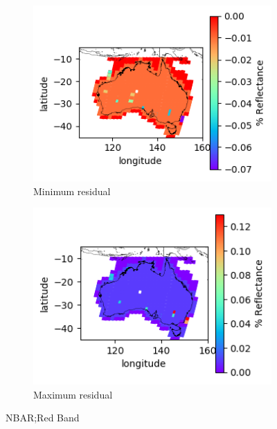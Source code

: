 \documentclass[a4paper]{article}
\begin{document}
      \begin{figure}[h!]
        \centering
          \begin{subfigure}[l]{.4\linewidth}
            \hspace{-32mm}
            \includegraphics[scale=0.9]{plots/nbar/nbar_red-MinResidual.png}
            \caption{Minimum residual}
          \end{subfigure}
%
          \begin{subfigure}[r]{.4\linewidth}
            \includegraphics[scale=0.9]{plots/nbar/nbar_red-MaxResidual.png}
            \caption{Maximum residual}
          \end{subfigure}
        \caption{NBAR;\@ Red Band}\label{figure:8}
      \end{figure}

  \clearpage
\end{document}
